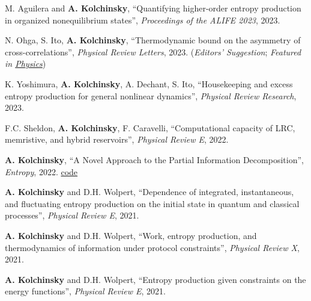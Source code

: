 M. Aguilera and \textbf{A. Kolchinsky}, ``Quantifying higher-order entropy production in organized nonequilibrium states'', \emph{Proceedings of the ALIFE 2023}, 2023.  

N. Ohga, S. Ito, \textbf{A. Kolchinsky}, ``Thermodynamic bound on the asymmetry of cross-correlations'', \emph{Physical Review Letters}, 2023. (\emph{Editors' Suggestion}; \emph{Featured in \href{https://physics.aps.org/articles/v16/142}{Physics}})  

K. Yoshimura, \textbf{A. Kolchinsky}, A. Dechant, S. Ito, ``Housekeeping and excess entropy production for general nonlinear dynamics'', \emph{Physical Review Research}, 2023.  

F.C. Sheldon, \textbf{A. Kolchinsky}, F. Caravelli, ``Computational capacity of LRC, memristive, and hybrid reservoirs'', \emph{Physical Review E}, 2022.  

\textbf{A. Kolchinsky}, ``A Novel Approach to the Partial Information Decomposition'', \emph{Entropy}, 2022.  \href{https://github.com/artemyk/redundancy}{code} 

\textbf{A. Kolchinsky} and D.H. Wolpert, ``Dependence of integrated, instantaneous, and fluctuating entropy production on the initial state in quantum and classical processes'', \emph{Physical Review E}, 2021.  

\textbf{A. Kolchinsky} and D.H. Wolpert, ``Work, entropy production, and thermodynamics of information under protocol constraints'', \emph{Physical Review X}, 2021.  

\textbf{A. Kolchinsky} and D.H. Wolpert, ``Entropy production given constraints on the energy functions'', \emph{Physical Review E}, 2021.  


